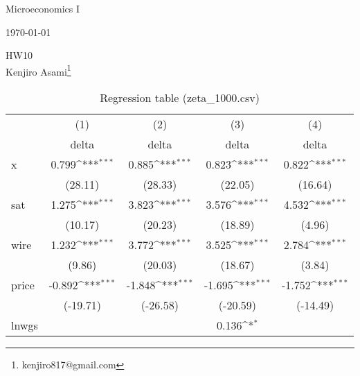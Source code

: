 \documentclass[a4paper, 12pt]{article}
\theoremstyle{definition}
\begin{document}
\vspace*{-2.5cm}
\begin{flushright}
	{Microeconomics I}
\end{flushright}
\vspace*{-0.7cm}
\begin{flushright}
	{\small \today}
\end{flushright}
\renewcommand{\thefootnote}{\fnsymbol{footnote}}
\begin{center}
	\vspace*{2truept}
	{\LARGE HW10}\\ %
	\vspace*{10truept}
	{\large Kenjiro Asami\footnote{kenjiro817@gmail.com}}
\end{center}
\renewcommand{\thefootnote}{\arabic{footnote}}
\setcounter{footnote}{0}
\begin{table}[htbp]\centering
	\def\sym#1{\ifmmode^{#1}\else\(^{#1}\)\fi}
	\caption{Regression table (zeta\_1000.csv)\label{tab1}}
	\begin{tabular}{l*{4}{c}}
		\hline\hline
		&\multicolumn{1}{c}{(1)}&\multicolumn{1}{c}{(2)}&\multicolumn{1}{c}{(3)}&\multicolumn{1}{c}{(4)}\\
		&\multicolumn{1}{c}{delta}&\multicolumn{1}{c}{delta}&\multicolumn{1}{c}{delta}&\multicolumn{1}{c}{delta}\\
		\hline
		x                   &       0.799\sym{***}&       0.885\sym{***}&       0.823\sym{***}&       0.822\sym{***}\\
		&     (28.11)         &     (28.33)         &     (22.05)         &     (16.64)         \\
		[1em]
		sat                 &       1.275\sym{***}&       3.823\sym{***}&       3.576\sym{***}&       4.532\sym{***}\\
		&     (10.17)         &     (20.23)         &     (18.89)         &      (4.96)         \\
		[1em]
		wire                &       1.232\sym{***}&       3.772\sym{***}&       3.525\sym{***}&       2.784\sym{***}\\
		&      (9.86)         &     (20.03)         &     (18.67)         &      (3.84)         \\
		[1em]
		price               &      -0.892\sym{***}&      -1.848\sym{***}&      -1.695\sym{***}&      -1.752\sym{***}\\
		&    (-19.71)         &    (-26.58)         &    (-20.59)         &    (-14.49)         \\
		[1em]
		lnwgs               &                     &                     &       0.136\sym{*}  &                     \\

\end{tabular}
\end{table}
\end{document}
